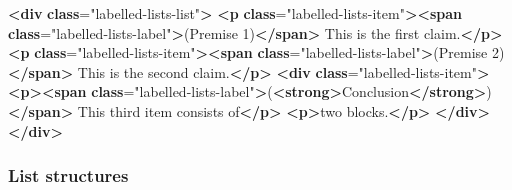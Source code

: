 \documentclass[
]{article}
\newenvironment{Shaded}{}{}
\newcommand{\ErrorTok}[1]{\textcolor[rgb]{1.00,0.00,0.00}{\textbf{#1}}}
\newcommand{\KeywordTok}[1]{\textcolor[rgb]{0.00,0.44,0.13}{\textbf{#1}}}
\newcommand{\NormalTok}[1]{#1}
\newcommand{\OtherTok}[1]{\textcolor[rgb]{0.00,0.44,0.13}{#1}}
\newcommand{\StringTok}[1]{\textcolor[rgb]{0.25,0.44,0.63}{#1}}
\begin{document}
\begin{Shaded}
\begin{Highlighting}[]
\KeywordTok{\textless{}div} \ErrorTok{class}\OtherTok{=}\StringTok{"labelled{-}lists{-}list"}\KeywordTok{\textgreater{}}
  \KeywordTok{\textless{}p} \ErrorTok{class}\OtherTok{=}\StringTok{"labelled{-}lists{-}item"}\KeywordTok{\textgreater{}\textless{}span} \ErrorTok{class}\OtherTok{=}\StringTok{"labelled{-}lists{-}label"}\KeywordTok{\textgreater{}}\NormalTok{(Premise 1)}\KeywordTok{\textless{}/span\textgreater{}}\NormalTok{ This is the first claim.}\KeywordTok{\textless{}/p\textgreater{}}
  \KeywordTok{\textless{}p} \ErrorTok{class}\OtherTok{=}\StringTok{"labelled{-}lists{-}item"}\KeywordTok{\textgreater{}\textless{}span} \ErrorTok{class}\OtherTok{=}\StringTok{"labelled{-}lists{-}label"}\KeywordTok{\textgreater{}}\NormalTok{(Premise 2)}\KeywordTok{\textless{}/span\textgreater{}}\NormalTok{ This is the second claim.}\KeywordTok{\textless{}/p\textgreater{}}
  \KeywordTok{\textless{}div} \ErrorTok{class}\OtherTok{=}\StringTok{"labelled{-}lists{-}item"}\KeywordTok{\textgreater{}}
    \KeywordTok{\textless{}p\textgreater{}\textless{}span} \ErrorTok{class}\OtherTok{=}\StringTok{"labelled{-}lists{-}label"}\KeywordTok{\textgreater{}}\NormalTok{(}\KeywordTok{\textless{}strong\textgreater{}}\NormalTok{Conclusion}\KeywordTok{\textless{}/strong\textgreater{}}\NormalTok{)}\KeywordTok{\textless{}/span\textgreater{}}\NormalTok{ This third item consists of}\KeywordTok{\textless{}/p\textgreater{}}
    \KeywordTok{\textless{}p\textgreater{}}\NormalTok{two blocks.}\KeywordTok{\textless{}/p\textgreater{}}
  \KeywordTok{\textless{}/div\textgreater{}}
\KeywordTok{\textless{}/div\textgreater{}}
\end{Highlighting}
\end{Shaded}

\hypertarget{list-structures}{%
\subsubsection{List structures}\label{list-structures}}
\end{document}
